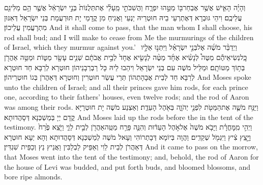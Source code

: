 {וְהָיָ֗ה הָאִ֛ישׁ אֲשֶׁ֥ר אֶבְחַר\maqqaf בּ֖וֹ מַטֵּ֣הוּ יִפְרָ֑ח וַהֲשִׁכֹּתִ֣י מֵֽעָלַ֗י אֶת\maqqaf תְּלֻנּוֹת֙ בְּנֵ֣י יִשְׂרָאֵ֔ל אֲשֶׁ֛ר הֵ֥ם מַלִּינִ֖ם עֲלֵיכֶֽם׃}
{וִיהֵי גּוּבְרָא דְּאֶתְרְעֵי בֵיהּ חוּטְרֵיהּ יַנְעֵי וַאֲנִיחַ מִן קֳדָמַי יָת תּוּרְעֲמָת בְּנֵי יִשְׂרָאֵל דְּאִנּוּן מִתְרָעֲמִין עֲלֵיכוֹן׃}
{And it shall come to pass, that the man whom I shall choose, his rod shall bud; and I will make to cease from Me the murmurings of the children of Israel, which they murmur against you.’}{}
{וַיְדַבֵּ֨ר מֹשֶׁ֜ה אֶל\maqqaf בְּנֵ֣י יִשְׂרָאֵ֗ל וַיִּתְּנ֣וּ אֵלָ֣יו \pasek  כׇּֽל\maqqaf נְשִׂיאֵיהֶ֡ם מַטֶּה֩ לְנָשִׂ֨יא אֶחָ֜ד מַטֶּ֨ה לְנָשִׂ֤יא אֶחָד֙ לְבֵ֣ית אֲבֹתָ֔ם שְׁנֵ֥ים עָשָׂ֖ר מַטּ֑וֹת וּמַטֵּ֥ה אַהֲרֹ֖ן בְּת֥וֹךְ מַטּוֹתָֽם׃}
{וּמַלֵּיל מֹשֶׁה עִם בְּנֵי יִשְׂרָאֵל וִיהַבוּ לֵיהּ כָּל רַבְרְבָנֵיהוֹן חוּטְרָא לְרַבָּא חַד חוּטְרָא לְרַבָּא חַד לְבֵית אֲבָהָתְהוֹן תְּרֵי עֲשַׂר חוּטְרִין וְחוּטְרָא דְּאַהֲרֹן בְּגוֹ חוּטְרֵיהוֹן׃}
{And Moses spoke unto the children of Israel; and all their princes gave him rods, for each prince one, according to their fathers’ houses, even twelve rods; and the rod of Aaron was among their rods.}{}
{וַיַּנַּ֥ח מֹשֶׁ֛ה אֶת\maqqaf הַמַּטֹּ֖ת לִפְנֵ֣י יְהֹוָ֑ה בְּאֹ֖הֶל הָעֵדֻֽת׃}
{וְאַצְנַע מֹשֶׁה יָת חוּטְרַיָּא קֳדָם יְיָ בְּמַשְׁכְּנָא דְּסָהֲדוּתָא׃}
{And Moses laid up the rods before the \lord\space in the tent of the testimony.}{}
{וַיְהִ֣י מִֽמׇּחֳרָ֗ת וַיָּבֹ֤א מֹשֶׁה֙ אֶל\maqqaf אֹ֣הֶל הָעֵד֔וּת וְהִנֵּ֛ה פָּרַ֥ח מַטֵּֽה\maqqaf אַהֲרֹ֖ן לְבֵ֣ית לֵוִ֑י וַיֹּ֤צֵֽא פֶ֙רַח֙ וַיָּ֣צֵֽץ צִ֔יץ וַיִּגְמֹ֖ל שְׁקֵדִֽים׃}
{וַהֲוָה בְּיוֹמָא דְּבָתְרוֹהִי וְעָאל מֹשֶׁה לְמַשְׁכְּנָא דְּסָהֲדוּתָא וְהָא יְעָא חוּטְרָא דְּאַהֲרֹן לְבֵית לֵוִי וְאַפֵּיק לַבְלַבִּין וַאֲנֵיץ נַץ וְכַפֵּית שִׁגְדִּין׃}
{And it came to pass on the morrow, that Moses went into the tent of the testimony; and, behold, the rod of Aaron for the house of Levi was budded, and put forth buds, and bloomed blossoms, and bore ripe almonds.}{}
